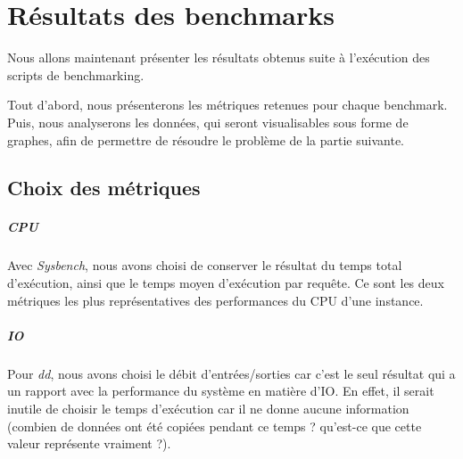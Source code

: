 \chapter{Résultats des benchmarks}

Nous allons maintenant présenter les résultats obtenus suite à l'exécution des scripts de benchmarking.

Tout d'abord, nous présenterons les métriques retenues pour chaque benchmark. Puis, nous analyserons les données, qui seront visualisables sous forme de graphes, afin de permettre de résoudre le problème de la partie suivante.

\section{Choix des métriques}
\paragraph{CPU} Avec \textit{Sysbench}, nous avons choisi de conserver le résultat du temps total d'exécution, ainsi que le temps moyen d'exécution par requête. Ce sont les deux métriques les plus représentatives des performances du CPU d'une instance.


\paragraph{IO} Pour \textit{dd}, nous avons choisi le débit d'entrées/sorties car c'est le seul résultat qui a un rapport avec la performance du système en matière d'IO. En effet, il serait inutile de choisir le temps d'exécution car il ne donne aucune information (combien de données ont été copiées pendant ce temps ? qu'est-ce que cette valeur représente vraiment ?).


